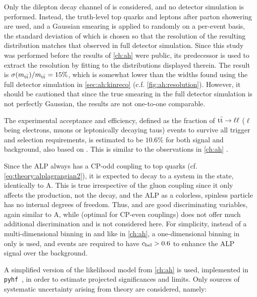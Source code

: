 Only the dilepton decay channel of \ttbar is considered, and no detector simulation is performed. Instead, the truth-level top quarks and leptons after parton showering are used, and a Gaussian smearing is applied to \mtt randomly on a per-event basis, the standard deviation of which is chosen so that the resolution of the resulting distribution matches that observed in full detector simulation. Since this study was performed before the results of \cref{ch:ah} were public, its predecessor  is used to extract the resolution by fitting to the \mtt distributions displayed therein. The result is $\sigma(m_{\mathrm{t \bar{t}}}) / m_{\mathrm{t \bar{t}}} = 15\%$, which is somewhat lower than the widths found using the full detector simulation in \cref{sec:ah:kinreco} (c.f. \cref{fig:ah:resolution}). However, it should be cautioned that since the true \mtt smearing in the full detector simulation is not perfectly Gaussian, the results are not one-to-one comparable. 

The experimental acceptance and efficiency, defined as the fraction of $\mathrm{t \bar{t}} \rightarrow \ell\ell$ ($\ell$ being electrons, muons or leptonically decaying taus) events to survive all trigger and selection requirements, is estimated to be $10.6\%$ for both signal and \ttbar background, also based on . This is similar to the observations in \cref{ch:ah} .

Since the ALP always has a CP-odd coupling to top quarks (cf. \cref{eq:theory:alplagrangian2}), it is expected to decay to a \ttbar system in the  state, identically to A. This is true irrespective of the gluon coupling \cG since it only affects the production, not the decay, and the ALP as a colorless, spinless particle has no internal degrees of freedom. Thus, \mtt and \chel are good discriminating variables, again similar to A, while \chan (optimal for CP-even couplings) does not offer much additional discrimination and is not considered here. For simplicity, instead of a multi-dimensional binning in \mtt and \chel like in \cref{ch:ah}, a one-dimensional binning in \mtt only is used, and events are required to have $c_{\mathrm{hel}} > 0.6$ to enhance the ALP signal over the background.

A simplified version of the likelihood model from \cref{ch:ah} is used, implemented in \texttt{pyhf}~\cite{pyhf_joss}, in order to estimate projected significances and limits. Only sources of systematic uncertainty arising from theory are considered, namely:

